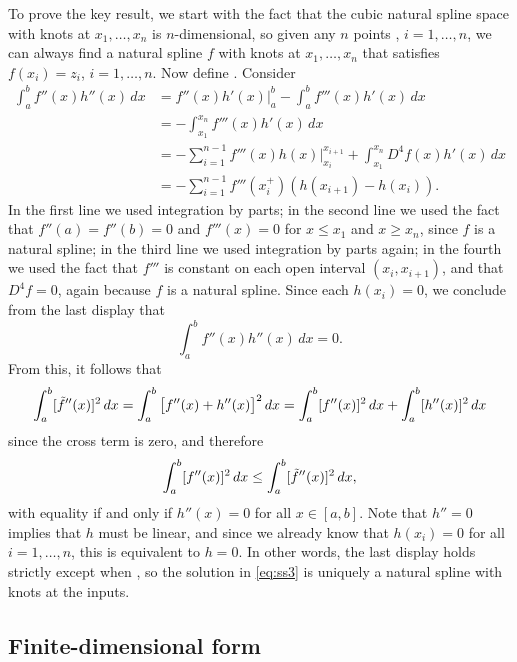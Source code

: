 \documentclass{article}
\begin{document}
To prove the key result, we start with the fact that the cubic natural spline
space with knots at $x_1,\dots,x_n$ is $n$-dimensional, so given any $n$ points  
, $i=1,\dots,n$, we can always find a natural spline $f$ 
with knots at $x_1,\dots,x_n$ that satisfies $f(x_i) = z_i$, $i=1,\dots,n$. Now 
define . Consider
\begin{align*}
\int_a^b f''(x) h''(x) \, dx 
&= f''(x) h'(x) \Big|_a^b - \int_a^b f'''(x) h'(x) \, dx \\
&= -\int_{x_1}^{x_n} f'''(x) h'(x) \, dx \\ 
&= -\sum_{i=1}^{n-1} f'''(x) h(x) \Big|_{x_i}^{x_{i+1}} +  
\int_{x_1}^{x_n} D^4 f(x) h'(x) \, dx \\
&= -\sum_{i=1}^{n-1} f'''(x_i^+) (h(x_{i+1}) - h(x_i)).
\end{align*}
In the first line we used integration by parts; in the second line we used the
fact that $f''(a) = f''(b) = 0$ and $f'''(x)=0$ for $x \leq x_1$ and $x \geq
x_n$, since $f$ is a natural spline; in the third line we used integration by
parts again; in the fourth we used the fact that $f'''$ is constant on each open
interval $(x_i,x_{i+1})$, and that $D^4 f=0$, again because $f$ is a natural
spline. Since each $h(x_i)=0$, we conclude from the last display that
\[
\int_a^b f''(x) h''(x) \, dx = 0.
\]
From this, it follows that
\[
\int_a^b [\tilde{f}''(x)]^2 \, dx 
= \int_a^b \big[ f''(x) + h''(x) \big]^2 \, dx 
= \int_a^b [f''(x)]^2 \, dx + \int_a^b [h''(x)]^2 \, dx
\]
since the cross term is zero, and therefore 
\[
\int_a^b [f''(x)]^2 \, dx \leq \int_a^b [\tilde{f}''(x)]^2 \, dx,
\]
with equality if and only if $h''(x)=0$ for all $x \in [a,b]$. Note that $h''=0$
implies that $h$ must be linear, and since we already know that $h(x_i)=0$ for
all $i=1,\dots,n$, this is equivalent to $h=0$. In other words, the last display
holds strictly except when , so the solution in \eqref{eq:ss3} is
uniquely a natural spline with knots at the inputs.

\subsection{Finite-dimensional form}
\end{document}
